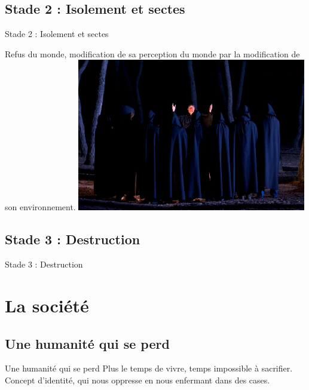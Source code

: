 \documentclass{beamer}
\begin{document}
\subsection{Stade 2 : Isolement et sectes}
\begin{frame}{Stade 2 : Isolement et sectes}
  \begin{center}
    Refus du monde, modification de sa perception du monde par la modification de son environnement.
    \includegraphics[width=10cm]{../Images/secte.png}
  \end{center}
\end{frame}

\subsection{Stade 3 : Destruction}
\begin{frame}{Stade 3 : Destruction}

\end{frame}


\section{La société}

\subsection{Une humanité qui se perd}
\begin{frame}{Une humanité qui se perd}
  Plus le temps de vivre, temps impossible à sacrifier.
  Concept d'identité, qui nous oppresse en nous enfermant dans des cases.
\end{frame}
\end{document}
